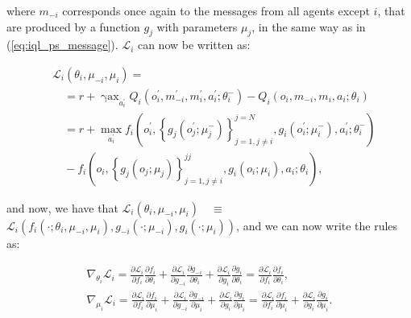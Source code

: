\documentclass{article}
\begin{document}
where $m_{-i}$ corresponds once again to the messages from all agents except $i$, that are produced by a function $g_j$ with parameters $\mu_j$, in the same way as in (\ref{eq:iql_ps_message}). $\mathcal{L}_i$ can now be written as:

\begin{equation}
\begin{aligned}
& \mathcal{L}_i\left(\theta_i, \mu_{-i}, \mu_i\right)= \\
& \quad=r+\operatorname{\gamma ax}_{a_i^{\prime}} Q_i\left(o_i^{\prime}, m_{-i}^{\prime}, m_i^{\prime}, a_i^{\prime} ; \theta_i^{-}\right)-Q_i\left(o_i, m_{-i}, m_i, a_i ; \theta_i\right) \\
& \quad=r+\max _{a_i^{\prime}} f_i\left(o_i^{\prime},\left\{g_j\left(o_j^{\prime} ; \mu_j^{-}\right)\right\}_{j=1, j \neq i}^{j=N}, g_i\left(o_i^{\prime} ; \mu_i^{-}\right), a_i^{\prime} ; \theta_i^{-}\right) \\
& \quad-f_i\left(o_i,\left\{g_j\left(o_j ; \mu_j\right)\right\}_{j=1, j \neq i}^{j j}, g_i\left(o_i ; \mu_i\right), a_i ; \theta_i\right),
\end{aligned}
\end{equation}

and now, we have that $\mathcal{L}_i\left(\theta_i, \mu_{-i}, \mu_i\right) \quad \equiv$ $\mathcal{L}_i\left(f_i\left(\cdot ; \theta_i, \mu_{-i}, \mu_i\right), g_{-i}\left(\cdot ; \mu_{-i}\right), g_i\left(\cdot ; \mu_i\right)\right)$, and we can now write the rules as:

\begin{equation}\label{eq:q_iql_nps}
\begin{gathered}
\nabla_{\theta_i} \mathcal{L}_i=\frac{\partial \mathcal{L}_i}{\partial f_i} \frac{\partial f_i}{\partial \theta_i}+\frac{\partial \mathcal{L}_i}{\partial g_{-i}} \frac{\partial g_{-i}}{\partial \theta_i}+\frac{\partial \mathcal{L}_i}{\partial g_i} \frac{\partial g_i}{\partial \theta_i}=\frac{\partial \mathcal{L}_i}{\partial f_i} \frac{\partial f_i}{\partial \theta_i}, \\
\nabla_{\mu_i} \mathcal{L}_i=\frac{\partial \mathcal{L}_i}{\partial f_i} \frac{\partial f_i}{\partial \mu_i}+\frac{\partial \mathcal{L}_i}{\partial g_{-i}} \frac{\partial g_{-i}}{\partial \mu_i}+\frac{\partial \mathcal{L}_i}{\partial g_i} \frac{\partial g_i}{\partial \mu_i}=\frac{\partial \mathcal{L}_i}{\partial f_i} \frac{\partial f_i}{\partial \mu_i}+\frac{\partial \mathcal{L}_i}{\partial g_i} \frac{\partial g_i}{\partial \mu_i} .
\end{gathered}
\end{equation}
\end{document}
